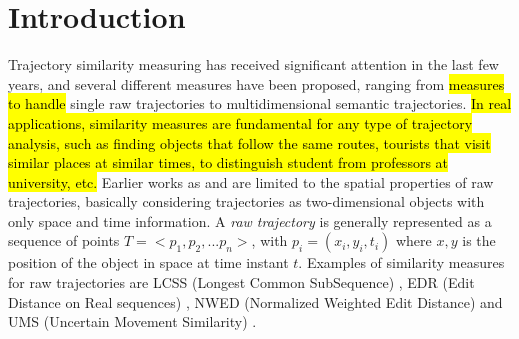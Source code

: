 \documentclass[12pt]{article}
\providecommand{\keywords}[1]
{
  \small    
  \textbf{\textit{Keywords---}} #1
}
\begin{document}
 




\section{Introduction}
Trajectory similarity measuring has received significant attention in the last few years, and several different measures have been proposed, ranging from \hl{measures to handle} single raw trajectories to multidimensional semantic trajectories. \hl{In real applications, similarity measures are fundamental for any type of trajectory analysis, such as finding objects that follow the same routes, tourists that visit similar places at similar times, to distinguish student from professors at university, etc.} Earlier works as \cite{vlachos2002discovering} and \cite{Chen:2005:RFS:1066157.1066213} are limited to the spatial properties of raw trajectories, basically considering trajectories as two-dimensional objects with only space and time information. A \emph{raw trajectory} is generally represented as a sequence of points $T=<p_1, p_2, ...p_n>$, with $p_i=(x_i,y_i,t_i)$ where $x,y$ is the position of the object in space at time instant $t$. Examples of similarity measures for raw trajectories are LCSS (Longest Common SubSequence) \citep{vlachos2002discovering}, EDR (Edit Distance on Real sequences) \citep{Chen:2005:RFS:1066157.1066213}, NWED (Normalized Weighted Edit Distance) \citep{dodge2012} and UMS (Uncertain Movement Similarity) \citep{Furtado-UMS-2018}.
\end{document}
